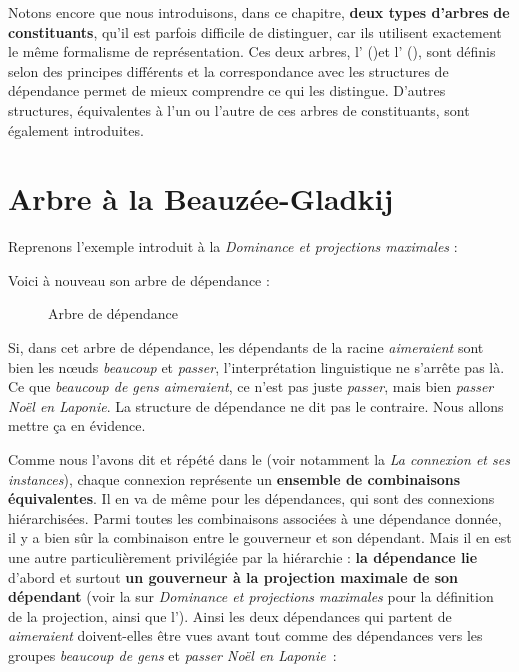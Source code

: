 Notons encore que nous introduisons, dans ce chapitre, \textbf{deux types d’arbres} \textbf{de constituants}, qu’il est parfois difficile de distinguer, car ils utilisent exactement le même formalisme de représentation. Ces deux arbres, l’ ()\textstyleTermes{ }et l’ (), sont définis selon des principes différents et la correspondance avec les structures de dépendance permet de mieux comprendre ce qui les distingue. D’autres structures, équivalentes à l’un ou l’autre de ces arbres de constituants, sont également introduites.

\section{ Arbre à la Beauzée-Gladkij}\label{sec:3.4.1}

Reprenons l’exemple introduit à la  \textit{Dominance et projections maximales} :

\z

Voici à nouveau son arbre de dépendance :

\begin{figure}

\caption{\label{fig:}Arbre de dépendance}

\end{figure}

Si, dans cet arbre de dépendance, les dépendants de la racine \textit{aimeraient} sont bien les nœuds \textit{beaucoup} et \textit{passer}, l’interprétation linguistique ne s’arrête pas là. Ce que \textit{beaucoup de gens aimeraient}, ce n’est pas juste \textit{passer}, mais bien \textit{passer Noël en Laponie}. La structure de dépendance ne dit pas le contraire. Nous allons mettre ça en évidence.

Comme nous l’avons dit et répété dans le  (voir notamment la  \textit{La connexion et ses instances}), chaque connexion représente un \textbf{ensemble de combinaisons équivalentes}. Il en va de même pour les dépendances, qui sont des connexions hiérarchisées. Parmi toutes les combinaisons associées à une dépendance donnée, il y a bien sûr la combinaison entre le gouverneur et son dépendant. Mais il en est une autre particulièrement privilégiée par la hiérarchie : \textbf{la dépendance lie} d’abord et surtout \textbf{un gouverneur à la projection maximale de son dépendant} (voir la  sur \textit{Dominance et projections maximales} pour la définition de la projection, ainsi que l’). Ainsi les deux dépendances qui partent de \textit{aimeraient} doivent-elles être vues avant tout comme des dépendances vers les groupes \textit{beaucoup de gens} et \textit{passer Noël en Laponie~}:

